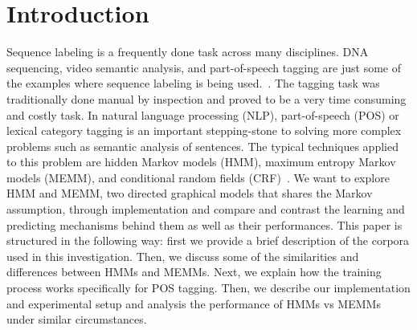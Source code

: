 \section{Introduction}
\label{sec:introduction}

Sequence labeling is a frequently done task across many disciplines. DNA sequencing, video semantic analysis, and part-of-speech tagging are just some of the examples where sequence labeling is being used.~\cite{dnaEx, videoEx, nlpEx}. The tagging task was traditionally done manual by inspection and proved to be a very time consuming and costly task. In natural language processing (NLP), part-of-speech (POS) or lexical category tagging is an important stepping-stone to solving more complex problems such as semantic analysis of sentences. The typical techniques applied to this problem are hidden Markov models (HMM), maximum entropy Markov models (MEMM), and conditional random fields (CRF)~\cite{nlpBook}. We want to explore HMM and MEMM, two directed graphical models that shares the Markov assumption, through implementation and compare and contrast the learning and predicting mechanisms behind them as well as their performances. This paper is structured in the following way: first we provide a brief description of the corpora used in this investigation. Then, we discuss some of the similarities and differences between HMMs and MEMMs. Next, we explain how the training process works specifically for POS tagging. Then, we describe our implementation and experimental setup and analysis the performance of HMMs vs MEMMs under similar circumstances.
